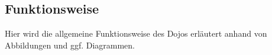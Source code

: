 \subsection{Funktionsweise} \label{sec:funktionsweise}

Hier wird die allgemeine Funktionsweise des Dojos erläutert anhand von Abbildungen und ggf. Diagrammen.
